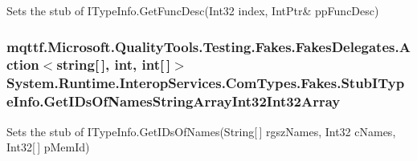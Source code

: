Sets the stub of I\-Type\-Info.\-Get\-Func\-Desc(Int32 index, Int\-Ptr\& pp\-Func\-Desc)

\hypertarget{class_system_1_1_runtime_1_1_interop_services_1_1_com_types_1_1_fakes_1_1_stub_i_type_info_a968085e2c984667683def3b6bd839ada}{
\subsubsection[{Get\-I\-Ds\-Of\-Names\-String\-Array\-Int32\-Int32\-Array}]{\setlength{\rightskip}{0pt plus 5cm}mqttf.\-Microsoft.\-Quality\-Tools.\-Testing.\-Fakes.\-Fakes\-Delegates.\-Action$<$string\mbox{[}$\,$\mbox{]}, int, int\mbox{[}$\,$\mbox{]}$>$ System.\-Runtime.\-Interop\-Services.\-Com\-Types.\-Fakes.\-Stub\-I\-Type\-Info.\-Get\-I\-Ds\-Of\-Names\-String\-Array\-Int32\-Int32\-Array}}\label{class_system_1_1_runtime_1_1_interop_services_1_1_com_types_1_1_fakes_1_1_stub_i_type_info_a968085e2c984667683def3b6bd839ada}


Sets the stub of I\-Type\-Info.\-Get\-I\-Ds\-Of\-Names(\-String\mbox{[}$\,$\mbox{]} rgsz\-Names, Int32 c\-Names, Int32\mbox{[}$\,$\mbox{]} p\-Mem\-Id)

